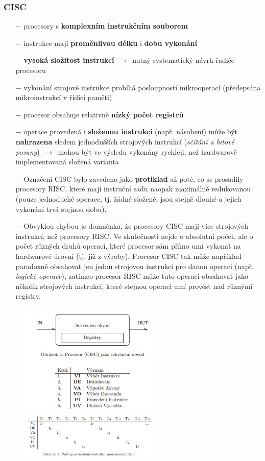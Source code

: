 \subsubsection{CISC}
\begin{itemize}
	\item[$-$]procesory s \textbf{komplexním instrukčním souborem}
	\item[$-$]instrukce mají \textbf{proměnlivou délku} i \textbf{dobu vykonání}
	\item[$-$]\textbf{vysoká složitost instrukcí} $\,\to\,$ nutný systematický návrh řadiče procesoru
	\item[$-$]vykonání strojové instrukce probíhá posloupností mikrooperací (předepsána mikroinstrukcí v řídící paměti)
	\item[$-$]procesor obsahuje relativně \textbf{nízký počet registrů}
	\item[$-$]operace provedená i \textbf{složenou instrukcí} (např. násobení) může být \textbf{nahrazena} sledem jednodušších strojových instrukcí (\textit{sčítání a bitové posuny}) $\,\to\,$ mohou být ve výsledu vykonány rychleji, než hardwarově implementovaná složená varianta
	\item[$-$]{Označení CISC bylo zavedeno jako \textbf{protiklad} až poté, co se prosadily procesory RISC, které mají instruční sadu naopak maximálně redukovanou (pouze jednoduché operace, tj. žádné složené, jsou stejně dlouhé a jejich vykonání trvá stejnou dobu).}
	\item[$-$]{Obvyklou chybou je domněnka, že procesory CISC mají více strojových instrukcí, než procesory RISC. Ve skutečnosti nejde o absolutní počet, ale o počet různých druhů operací, které procesor sám přímo umí vykonat na hardwarové úrovni (tj. již z výroby). Procesor CISC tak může například paradoxně obsahovat jen jednu strojovou instrukci pro danou operaci (např. \textit{logické operace}), zatímco procesor RISC může tuto operaci obsahovat jako několik strojových instrukcí, které stejnou operaci umí provést nad různými registry.}
\end{itemize}
\begin{figure}[H]
\centering
\includegraphics[width=0.6\textwidth]{assets/1_cisc_sekv}
\includegraphics[width=0.6\textwidth]{assets/1_cisc_instrukce}
\end{figure}

